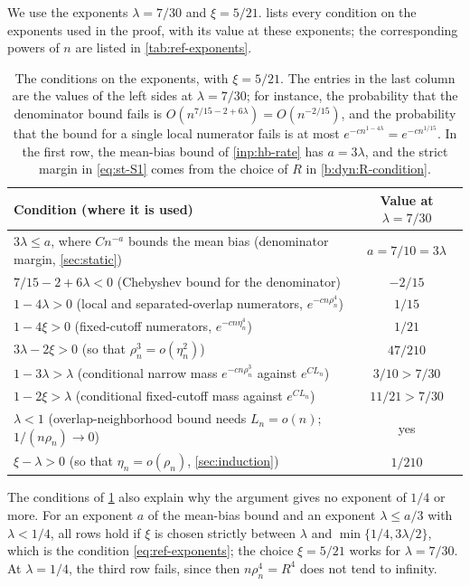 We use the exponents $\lambda=7/30$ and $\xi=5/21$.  lists every condition on the exponents used in the proof, with its value at these exponents; the corresponding powers of $n$ are listed in \cref{tab:ref-exponents}.

\begin{table}[ht]
\centering
\small
\begin{tabular}{@{}>{\raggedright\arraybackslash}p{}c@{}}
\toprule
Condition (where it is used) & Value at $\lambda=7/30$ \\
\midrule
$3\lambda\le a$, where $Cn^{-a}$ bounds the mean bias (denominator margin, \cref{sec:static}) & $a=7/10=3\lambda$ \\
$7/15-2+6\lambda<0$ (Chebyshev bound for the denominator) & $-2/15$ \\
$1-4\lambda>0$ (local and separated-overlap numerators, $e^{-cn\rho_n^4}$) & $1/15$ \\
$1-4\xi>0$ (fixed-cutoff numerators, $e^{-cn\eta_n^4}$) & $1/21$ \\
$3\lambda-2\xi>0$ (so that $\rho_n^3=o(\eta_n^2)$) & $47/210$ \\
$1-3\lambda>\lambda$ (conditional narrow mass $e^{-cn\rho_n^3}$ against $e^{CL_n}$) & $3/10>7/30$ \\
$1-2\xi>\lambda$ (conditional fixed-cutoff mass against $e^{CL_n}$) & $11/21>7/30$ \\
$\lambda<1$ (overlap-neighborhood bound needs $L_n=o(n)$; $1/(n\rho_n)\to0$) & yes \\
$\xi-\lambda>0$ (so that $\eta_n=o(\rho_n)$, \cref{sec:induction}) & $1/210$ \\
\bottomrule
\end{tabular}
\caption{The conditions on the exponents, with $\xi=5/21$. The entries in the last column are the values of the left sides at $\lambda=7/30$; for instance, the probability that the denominator bound fails is $O(n^{7/15-2+6\lambda})=O(n^{-2/15})$, and the probability that the bound for a single local numerator fails is at most $e^{-cn^{1-4\lambda}}=e^{-cn^{1/15}}$. In the first row, the mean-bias bound of \cref{inp:hb-rate} has $a=3\lambda$, and the strict margin in \eqref{eq:st-S1} comes from the choice of $R$ in \eqref{b:dyn:R-condition}.}
\label{tab:bp-exponents}
\end{table}

The conditions of \cref{tab:bp-exponents} also explain why the argument gives no exponent of $1/4$ or more. For an exponent $a$ of the mean-bias bound and an exponent $\lambda\le a/3$ with $\lambda<1/4$, all rows hold if $\xi$ is chosen strictly between $\lambda$ and $\min\{1/4,3\lambda/2\}$, which is the condition \eqref{eq:ref-exponents}; the choice $\xi=5/21$ works for $\lambda=7/30$. At $\lambda=1/4$, the third row fails, since then $n\rho_n^4=R^4$ does not tend to infinity.

